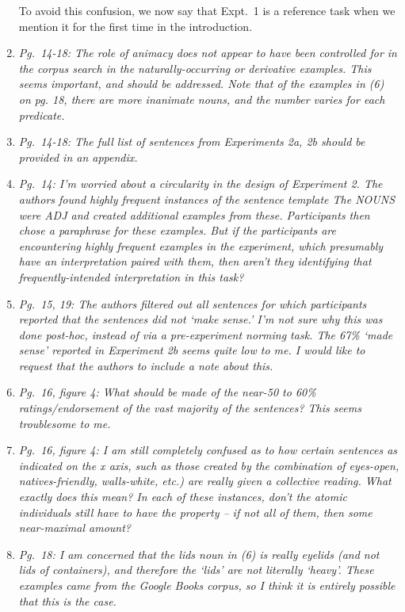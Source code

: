 \documentclass[12pt]{article}
\begin{document}
\begin{enumerate}
To avoid this confusion, we now say that Expt.~1 is a reference task when we mention it for the first time in the introduction.

\item \emph{Pg.~14-18: The role of animacy does not appear to have been controlled for in the corpus search in the naturally-occurring or derivative examples. This seems important, and should be addressed. Note that of the examples in (6) on pg. 18, there are more inanimate nouns, and the number varies for each predicate.}

\item \emph{Pg.~14-18: The full list of sentences from Experiments 2a, 2b should be provided in an appendix.}

\item \emph{Pg.~14: I'm worried about a circularity in the design of Experiment 2. The authors found highly frequent instances of the sentence template \emph{The NOUNS were ADJ} and created additional examples from these. Participants then chose a paraphrase for these examples. But if the participants are encountering highly frequent examples in the experiment, which presumably have an interpretation paired with them, then aren't they identifying that frequently-intended interpretation in this task?}

\item \emph{Pg.~15, 19: The authors filtered out all sentences for which participants reported that the sentences did not `make sense.' I'm not sure why this was done post-hoc, instead of via a pre-experiment norming task. The 67\% `made sense' reported in Experiment 2b seems quite low to me. I would like to request that the authors to include a note about this.}

\item \emph{Pg.~16, figure 4: What should be made of the near-50 to 60\% ratings/endorsement of the vast majority of the sentences? This seems troublesome to me.}

\item \emph{Pg.~16, figure 4: I am still completely confused as to how certain sentences as indicated on the x axis, such as those created by the combination of eyes-open, natives-friendly, walls-white, etc.) are really given a collective reading. What exactly does this mean? In each of these instances, don’t the atomic individuals still have to have the property – if not all of them, then some near-maximal amount?}

\item \emph{Pg.~18: I am concerned that the \emph{lids} noun in (6) is really eyelids (and not lids of containers), and therefore the `lids' are not literally ‘heavy’. These examples came from the Google Books corpus, so I think it is entirely possible that this is the case.}


\end{enumerate}
\end{document}
